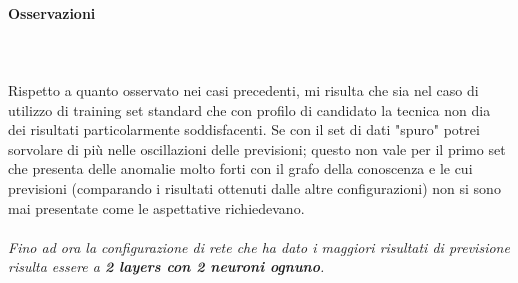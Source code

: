 \paragraph{Osservazioni}\mbox{}
\label{Osservazioni su rete a 4 neuroni per 1 layers}
\\\\
\noindent
Rispetto a quanto osservato nei casi precedenti, mi risulta che sia nel caso di utilizzo di training set standard che con profilo di candidato la tecnica non dia dei risultati particolarmente soddisfacenti. Se con il set di dati "spuro" potrei sorvolare di pi\`u nelle oscillazioni delle previsioni; questo non vale per il primo set che presenta delle anomalie molto forti con il grafo della conoscenza e le cui previsioni (comparando i risultati ottenuti dalle altre configurazioni) non si sono mai presentate come le aspettative richiedevano.
\\\\
\noindent
\textit{Fino ad ora la configurazione di rete che ha dato i maggiori risultati di previsione risulta essere a \textbf{2 layers con 2 neuroni ognuno}.}



